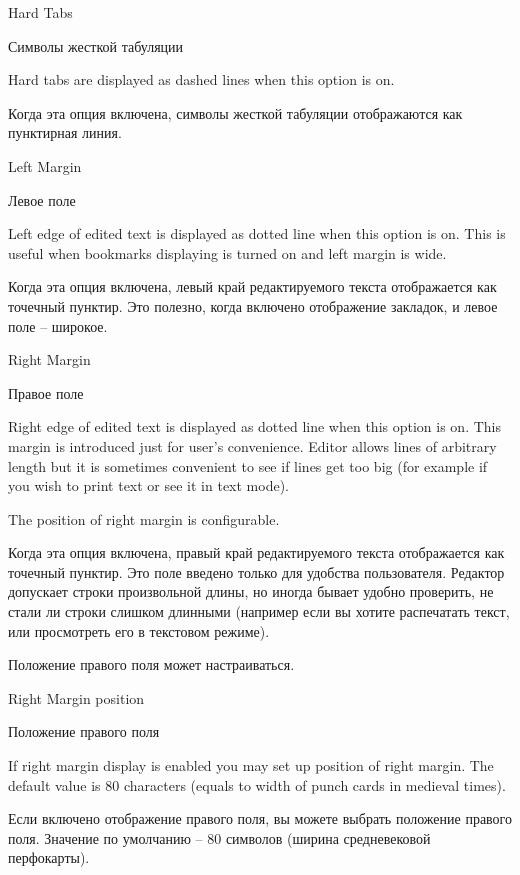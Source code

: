 \begin{popup}
\ifenglish
\caption{Hard Tabs}
\else
\caption{Символы жесткой табуляции}
\fi
{}
\ifenglish
Hard tabs are displayed as dashed lines when this option is on.

\else
Когда эта опция включена, символы жесткой табуляции отображаются как пунктирная
линия.
\fi
\end{popup}

\begin{popup}
\ifenglish
\caption{Left Margin}
\else
\caption{Левое поле}
\fi
{}

\ifenglish
Left edge of edited text is displayed as dotted line when this option is on.
This is useful when bookmarks displaying is turned on and left margin is wide.

\else
Когда эта опция включена, левый край редактируемого текста отображается как
точечный пунктир. Это полезно, когда включено отображение закладок, и левое поле
-- широкое.
\fi
\end{popup}

\begin{popup}
\ifenglish
\caption{Right Margin}
\else
\caption{Правое поле}
\fi
{}

\ifenglish
Right edge of edited text is displayed as dotted line when this option is on.
This margin is introduced just for user's convenience. Editor allows lines of arbitrary
length but it is sometimes convenient to see if lines get too big (for example if
you wish to print text or see it in text mode).

The position of right margin is configurable.

\else
Когда эта опция включена, правый край редактируемого текста отображается как
точечный пунктир. Это поле введено только для удобства пользователя. Редактор
допускает строки произвольной длины, но иногда бывает удобно проверить, не стали
ли строки слишком длинными (например если вы хотите распечатать текст, или
просмотреть его в текстовом режиме).

Положение правого поля может настраиваться.
\fi
\end{popup}

\begin{popup}
\ifenglish
\caption{Right Margin position}
\else
\caption{Положение правого поля}
\fi
{}

\ifenglish
If right margin display is enabled you may set up position of right margin.
The default value is 80 characters (equals to width of punch cards in medieval times).

\else
Если включено отображение правого поля, вы можете выбрать положение правого поля.
Значение по умолчанию -- 80 символов (ширина средневековой перфокарты).
\fi
\end{popup}

